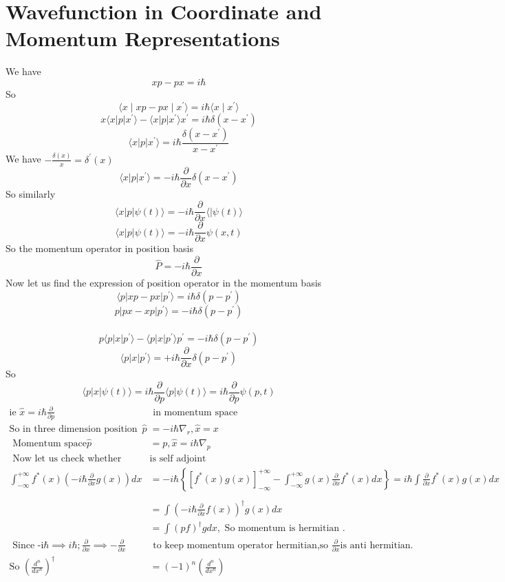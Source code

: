 \section{Wavefunction in Coordinate and Momentum Representations}
We have $$xp-px=i\hbar$$
So $$\langle x\mid xp-px\mid x^{\prime}\rangle=i\hbar\langle x\mid x^{\prime}\rangle$$
$$x\langle x |p|x^{\prime}\rangle -\langle x |p|x^{\prime}\rangle x^{\prime}=i\hbar \delta(x-x^{\prime})$$
$$\langle x|p|x^{\prime}\rangle =i\hbar \frac{\delta(x-x^{\prime})}{x-x^{\prime}}$$
We have $-\frac{\delta(x)}{x}=\delta^{\prime}(x)$\\
$$\langle x|p|x^{\prime}\rangle=-i\hbar \frac{\partial}{\partial x}\delta(x-x^{\prime})$$
So similarly $$\langle x|p|\psi(t)\rangle=-i\hbar\frac{\partial}{\partial x} \langle|\psi(t)\rangle$$
$$\langle x|p|\psi(t)\rangle=-i\hbar \frac{\partial }{\partial x}\psi(x,t)$$
So the momentum operator in position basis \\
$$\hat{P}=-i\hbar \frac{\partial}{\partial x}$$
Now let us find the expression of position operator in the momentum basis \\
$$\langle p|xp-px|p^{\prime}\rangle =i\hbar \delta (p-p^{\prime})$$
$$p|px-xp|p^{\prime}\rangle =-i\hbar \delta(p-p^{\prime})$$\\
$$p\langle p|x|p^{\prime}\rangle -\langle p|x|p^{\prime}\rangle p^{\prime}=-i\hbar\delta(p-p^{\prime})$$
$$\langle p|x|p^{\prime}\rangle=+i\hbar\frac{\partial}{\partial x}\delta(p-p^{\prime})$$
So $$\langle p|x|\psi(t)\rangle =i\hbar\frac{\partial}{\partial p} \langle p|\psi(t)\rangle=i\hbar\frac{\partial}{\partial p}\psi (p,t)$$
	$$
	\begin{aligned}
	\text{ie }\hat{x}=i\hbar\frac{\partial}{\partial p}&\text{ in momentum space}\\
	\text{So in three dimension position space}
	\hat{p}&=-i\hbar \nabla_{r}, 
	\hat{x}=x\\
\text{	Momentum space}
	\hat{p}&=p, 
	\hat{x}=i\hbar \nabla_{p}\\
\text{	Now let us check whether momentum }&\text{is self adjoint}\\
	\int_{-\infty}^{+\infty} f^*(x)\left( -i\hbar \frac{\partial}{\partial x}g(x)\right)dx&=-i\hbar\left\lbrace  \left[ f^{*}(x)g(x) \right]_{-\infty}^{+\infty}-\int_{-\infty}^{+\infty} g(x)\frac{\partial}{\partial x}f^*(x)dx\right\rbrace 
	=i\hbar \int \frac{\partial}{\partial x} f^*(x) g(x)dx\\
	\\&=\int\left( -i\hbar \frac{\partial}{\partial x}f(x)\right) ^{\dagger}g(x)dx\\
	&=\int(pf)^{\dagger}g dx,\text{  So momentum is hermitian .}\\
\text{	Since -i}\hbar\implies i\hbar;\frac{\partial}{\partial x} \implies -\frac{\partial}{\partial x}&\text{ to keep momentum operator hermitian,so } \frac{\partial}{\partial x} \text{is anti hermitian.}\\
	\text{So }\left( \frac{d^n}{dx^n}\right) ^{\dagger}&=(-1)^n \left( \frac{d^n}{dx^n}\right)\\
\end{aligned}
$$
